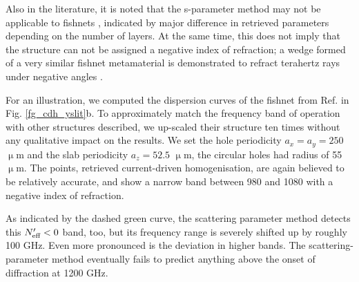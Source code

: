 
Also in the literature, it is noted that the s-parameter method may not be applicable to fishnets \cite{croenne2009left}\cite[p. 102]{croenne2009controle}, indicated by major difference in retrieved parameters depending on the number of layers. At the same time, this does not imply that the structure can not be assigned a negative index of refraction; a wedge formed  of a very similar fishnet metamaterial is demonstrated to refract terahertz rays under negative angles \cite{wang2010composite}. 

For an illustration, we computed the dispersion curves of the fishnet from Ref. \cite{navarro2011dual} in Fig. \ref{fg_cdh_yslit}b. To approximately match the frequency band of operation with other structures described, we up-scaled their structure ten times without any qualitative impact on the results. We set the hole periodicity $a_x=a_y = 250$ $\upmu$m and the slab periodicity $a_z = 52.5$ $\upmu$m, the circular holes had radius of 55 $\upmu$m. The points, retrieved current-driven homogenisation, are again believed to be relatively accurate, and show a narrow band between 980 and 1080 with a negative index of refraction. 

As indicated by the dashed green curve, the scattering parameter method detects this $N_{\text{eff} }'<0$ band, too, but its frequency range is severely shifted up by roughly 100 GHz. Even more pronounced is the deviation in higher bands. The scattering-parameter method eventually fails to predict anything above the onset of diffraction at 1200 GHz.


